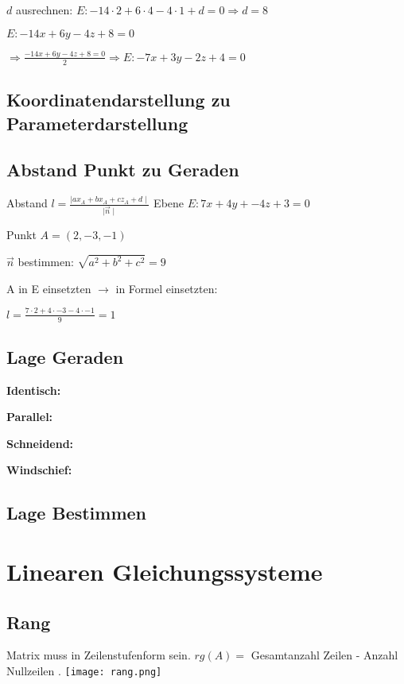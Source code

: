 \begin{multicols*}{3}
     $d$ ausrechnen: $ E: -14 \cdot 2  + 6 \cdot 4 - 4\cdot 1 + d = 0 \Rightarrow d = 8$

     $E: -14x + 6y - 4z + 8 = 0$

    $\Rightarrow \frac{-14x + 6y - 4z + 8 = 0}{2} \Rightarrow E: -7x + 3y - 2z + 4 = 0$

    \subsection{Koordinatendarstellung zu Parameterdarstellung }


    \subsection{Abstand Punkt zu Geraden}
    {Abstand \Large $  l = \frac{\mid ax_A + bx_A + cz_A + d  \mid}{\mid \vec{n} \mid}$ }
    {Ebene $E:  7x+4y+-4z+3=0 $}

    {Punkt $A = (2,-3,-1)$}

    
    { $\vec{n}$ bestimmen: $\sqrt{a^2+b^2+c^2} = 9$}

    { A in E einsetzten $ \rightarrow $ in Formel einsetzten: }
   
    {$l = \frac{7 \cdot 2 + 4 \cdot -3 -4 \cdot -1}{9} = 1$}

    \subsection{Lage Geraden}

    \textbf{Identisch:}

    \textbf{Parallel:}

    \textbf{Schneidend:}

    \textbf{Windschief:}

    \subsection{Lage Bestimmen}

    \section{Linearen Gleichungssysteme}
    \subsection{Rang}
    {Matrix muss in Zeilenstufenform sein.}
    {$rg(A) = $ Gesamtanzahl Zeilen - Anzahl Nullzeilen .}
    \texttt{[image: rang.png]}


\end{multicols*}
